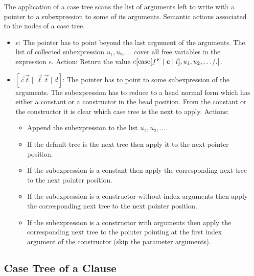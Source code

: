 The application of a case tree scans the list of arguments left to write with a
pointer to a subexpression to some of its arguments. Semantic actions associated
to the nodes of a case tree.
\begin{itemize}
    \item $e$: The pointer has to point beyond the last argument of the
        arguments. The list of collected subexpression $u_1, u_2, \ldots$ cover
        all free variables in the expression $e$. Action: Return the value
        $e[{\text{case}}[f^F \mid {\mathbf c} \mid t], u_1,u_2,\ldots / .]$.

    \item $[\vec c \vec t \mid \vec \ell \vec t \mid d]$:
        The pointer has to point to some subexpression of the arguments. The
        subexpression has to reduce to a head normal form which has either a
        constant or a constructor in the head position. From the constant or the
        constructor it is clear which case tree is the next to apply.
        Actions:
        \begin{itemize}
            \item Append the subexpression to the list $u_1,u_2,\ldots$.

            \item If the default tree is the next tree then apply it to the next
                pointer position.

            \item If the subexpression is a constant then apply the
                corresponding next tree to the next pointer position.

            \item If the subexpression is a constructor without index
                arguments then apply the corresponding next tree to the next
                pointer position.

            \item If the subexpression is a constructor with arguments then
                apply the corresponding next tree to the pointer pointing at the
                first index argument of the constructor (skip the parameter
                arguments).
        \end{itemize}
\end{itemize}




\subsection{Case Tree of a Clause}

